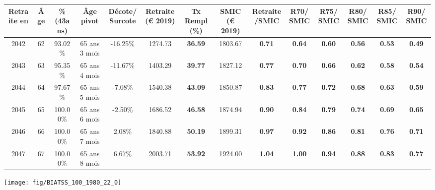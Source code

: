 \begin{adjustbox}{max width=\textwidth} 
\begin{tabular}[htb]{|c|c||c|c|c||c|c||c|c||c|c|c|c|c|} 
\hline 
 Retraite en &  Âge &  \%(43ans) &  Âge pivot &  Décote/Surcote &  Retraite (\euro{} 2019) &  Tx Rempl(\%) &  SMIC (\euro{} 2019) &  Retraite/SMIC &  R70/SMIC &  R75/SMIC &  R80/SMIC &  R85/SMIC &  R90/SMIC \\ 
\hline \hline 
 2042 &  62 &  93.02\% &  65 ans 3 mois &  -16.25\% &  1274.73 &  {\bf 36.59} &  1803.67 &  {\bf {\color{red} 0.71}} &  {\bf {\color{red} 0.64}} &  {\bf {\color{red} 0.60}} &  {\bf {\color{red} 0.56}} &  {\bf {\color{red} 0.53}} &  {\bf {\color{red} 0.49}} \\ 
\hline 
 2043 &  63 &  95.35\% &  65 ans 4 mois &  -11.67\% &  1403.29 &  {\bf 39.77} &  1827.12 &  {\bf {\color{red} 0.77}} &  {\bf {\color{red} 0.70}} &  {\bf {\color{red} 0.66}} &  {\bf {\color{red} 0.62}} &  {\bf {\color{red} 0.58}} &  {\bf {\color{red} 0.54}} \\ 
\hline 
 2044 &  64 &  97.67\% &  65 ans 5 mois &  -7.08\% &  1540.38 &  {\bf 43.09} &  1850.87 &  {\bf {\color{red} 0.83}} &  {\bf {\color{red} 0.77}} &  {\bf {\color{red} 0.72}} &  {\bf {\color{red} 0.68}} &  {\bf {\color{red} 0.63}} &  {\bf {\color{red} 0.59}} \\ 
\hline 
 2045 &  65 &  100.00\% &  65 ans 6 mois &  -2.50\% &  1686.52 &  {\bf 46.58} &  1874.94 &  {\bf {\color{red} 0.90}} &  {\bf {\color{red} 0.84}} &  {\bf {\color{red} 0.79}} &  {\bf {\color{red} 0.74}} &  {\bf {\color{red} 0.69}} &  {\bf {\color{red} 0.65}} \\ 
\hline 
 2046 &  66 &  100.00\% &  65 ans 7 mois &  2.08\% &  1840.88 &  {\bf 50.19} &  1899.31 &  {\bf {\color{red} 0.97}} &  {\bf {\color{red} 0.92}} &  {\bf {\color{red} 0.86}} &  {\bf {\color{red} 0.81}} &  {\bf {\color{red} 0.76}} &  {\bf {\color{red} 0.71}} \\ 
\hline 
 2047 &  67 &  100.00\% &  65 ans 8 mois &  6.67\% &  2003.71 &  {\bf 53.92} &  1924.00 &  {\bf 1.04} &  {\bf 1.00} &  {\bf {\color{red} 0.94}} &  {\bf {\color{red} 0.88}} &  {\bf {\color{red} 0.83}} &  {\bf {\color{red} 0.77}} \\ 
\hline 
\hline 
\end{tabular} 
\end{adjustbox} 
 
 \vspace{0.1cm} 

 {\hspace{-2.2cm}\texttt{[image: fig/BIATSS\_100\_1980\_22\_0]}} 

